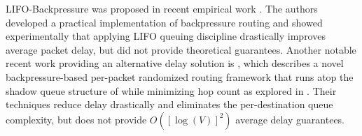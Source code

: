 \documentclass[journal]{IEEEtran}
\begin{document}

LIFO-Backpressure was proposed in recent empirical work \cite{scott_lifo_ipsn}. The authors developed a practical implementation of backpressure routing and showed experimentally that applying LIFO queuing discipline drastically improves average packet delay, but did not provide theoretical guarantees. 
%
Another notable recent work providing an alternative delay solution is  \cite{athanasopoulouTON10}, which describes a novel backpressure-based per-packet randomized routing framework that runs atop the shadow queue structure of \cite{buimulticast} while minimizing hop count as explored in \cite{buisrikant_infocom09}.  Their techniques reduce delay drastically and eliminates the per-destination queue complexity, but does not provide $O([\log(V)]^2)$ average delay guarantees.
\end{document}
